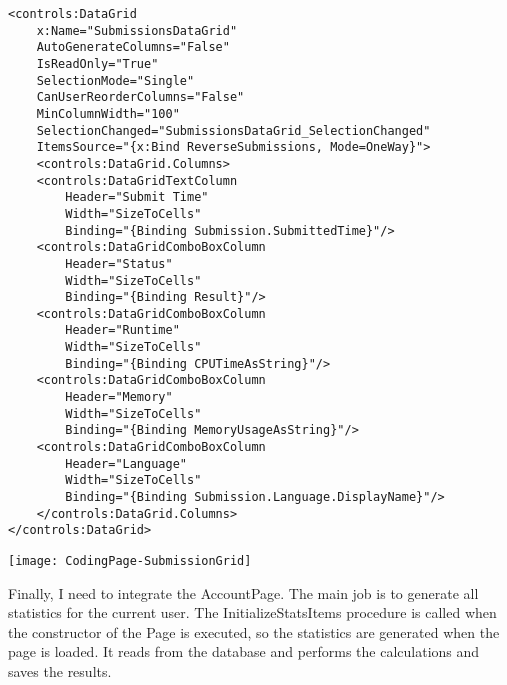 \documentclass[report.tex]{subfiles}
\begin{document}
\begin{verbatim}
<controls:DataGrid
    x:Name="SubmissionsDataGrid"
    AutoGenerateColumns="False"
    IsReadOnly="True"
    SelectionMode="Single"
    CanUserReorderColumns="False"
    MinColumnWidth="100"
    SelectionChanged="SubmissionsDataGrid_SelectionChanged"
    ItemsSource="{x:Bind ReverseSubmissions, Mode=OneWay}">
    <controls:DataGrid.Columns>
    <controls:DataGridTextColumn
        Header="Submit Time"
        Width="SizeToCells"
        Binding="{Binding Submission.SubmittedTime}"/>
    <controls:DataGridComboBoxColumn
        Header="Status"
        Width="SizeToCells"
        Binding="{Binding Result}"/>
    <controls:DataGridComboBoxColumn
        Header="Runtime"
        Width="SizeToCells"
        Binding="{Binding CPUTimeAsString}"/>
    <controls:DataGridComboBoxColumn
        Header="Memory"
        Width="SizeToCells"
        Binding="{Binding MemoryUsageAsString}"/>
    <controls:DataGridComboBoxColumn
        Header="Language"
        Width="SizeToCells"
        Binding="{Binding Submission.Language.DisplayName}"/>
    </controls:DataGrid.Columns>
</controls:DataGrid>
\end{verbatim}

\texttt{[image: CodingPage-SubmissionGrid]}

Finally, I need to integrate the AccountPage. The main job is to generate all statistics for the current user. The InitializeStatsItems procedure is called when the constructor of the Page is executed, so the statistics are generated when the page is loaded. It reads from the database and performs the calculations and saves the results.
\end{document}
